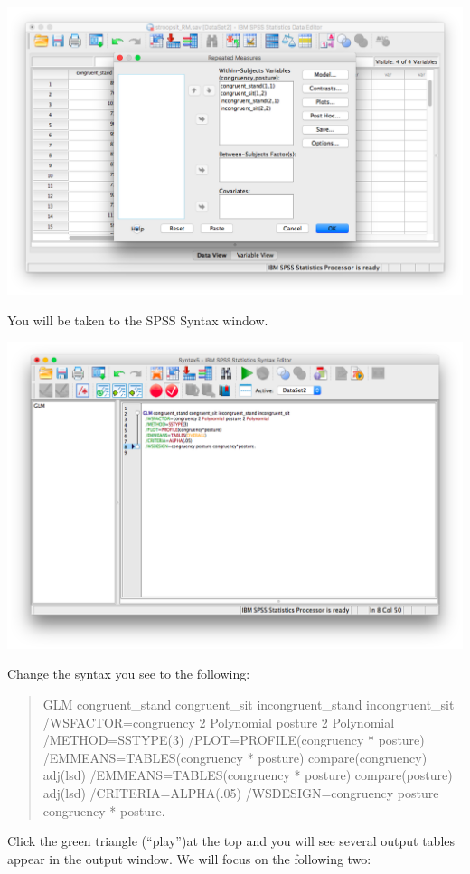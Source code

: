 \documentclass[
]{book}
\begin{document}
\includegraphics{img/10.4.33.png}

You will be taken to the SPSS Syntax window.

\includegraphics{img/10.4.34.png}

Change the syntax you see to the following:

\begin{quote}
GLM congruent\_stand congruent\_sit incongruent\_stand incongruent\_sit
/WSFACTOR=congruency 2 Polynomial posture 2 Polynomial
/METHOD=SSTYPE(3)
/PLOT=PROFILE(congruency * posture)
/EMMEANS=TABLES(congruency * posture) compare(congruency) adj(lsd)
/EMMEANS=TABLES(congruency * posture) compare(posture) adj(lsd)
/CRITERIA=ALPHA(.05)
/WSDESIGN=congruency posture congruency * posture.
\end{quote}

Click the green triangle ({``play''})at the top and you will see several output tables appear in the output window. We will focus on the following two:
\end{document}
